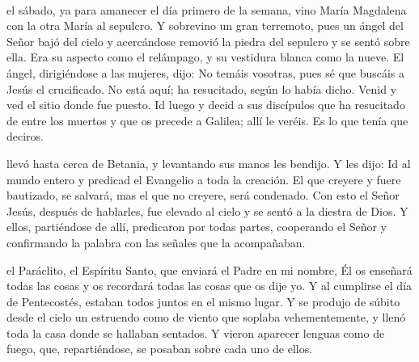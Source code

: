 \documentclass[10pt,twoside]{book}
\begin{document}
\\[4mm]
\vspace{2mm}
el sábado, ya para amanecer el día primero de la semana, vino María Magdalena con la otra María al sepulcro. Y sobrevino un gran terremoto,
pues un ángel del Señor bajó del cielo y acercándose removió la piedra del sepulcro y se sentó sobre ella. Era su aspecto como el relámpago, y su vestidura blanca como la nueve.
El ángel, dirigiéndose a las mujeres, dijo: No temáis vosotras, pues sé que buscáis a Jesús el crucificado. No está aquí; ha resucitado, según lo había dicho.
Venid y ved el sitio donde fue puesto. Id luego y decid a sus discípulos que ha resucitado de entre los muertos y que os precede a Galilea; allí le veréis.
Es lo que tenía que deciros.\\[-2mm]

\vspace{5mm}

\vspace{2mm}
llevó hasta cerca de Betania, y levantando sus manos les bendijo. Y les dijo: Id al mundo entero y predicad el Evangelio a toda la creación.
El que creyere y fuere bautizado, se salvará, mas el que no creyere, será condenado. Con esto el Señor Jesús, después de hablarles, fue elevado al cielo y se sentó a la diestra de Dios.
Y ellos, partiéndose de allí, predicaron por todas partes, cooperando el Señor y confirmando la palabra con las señales que la acompañaban.\\[2mm]

\vspace{5mm}

\vspace{2mm}
el Paráclito, el Espíritu Santo, que enviará el Padre en mi nombre, Él os enseñará todas las cosas y os recordará todas las cosas que os dije yo.
Y al cumplirse el día de Pentecostés, estaban todos juntos en el mismo lugar. Y se produjo de súbito desde el cielo un estruendo como de viento que soplaba vehementemente,
y llenó toda la casa donde se hallaban sentados. Y vieron aparecer lenguas como de fuego, que, repartiéndose, se posaban sobre cada uno de ellos.\\[2mm]

\vspace{5mm}
\end{document}
